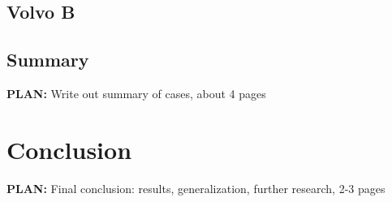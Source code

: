 \documentclass{tut-thesis}
\begin{document}
\section{Volvo B}

\section{Summary}
\textbf{PLAN:} Write out summary of cases, about 4 pages

\chapter{Conclusion}
\textbf{PLAN:} Final conclusion: results, generalization, further research, 2-3 pages

\begingroup
\let\itshape\upshape
\printbibliography{}
\endgroup
\end{document}

